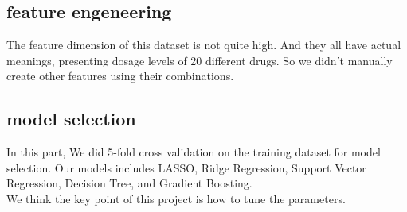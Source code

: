 \documentclass{article}
\begin{document}
\subsection{feature engeneering}
The feature dimension of this dataset is not quite high. And they all have actual meanings, presenting dosage levels of 20 different drugs. So we didn't manually create other features using their combinations.

\subsection{model selection}
In this part, We did 5-fold cross validation on the training dataset for model selection. Our models includes LASSO, Ridge Regression, Support Vector Regression, Decision Tree, and Gradient Boosting. \\
We think the key point of this project is how to tune the parameters.
\end{document}
